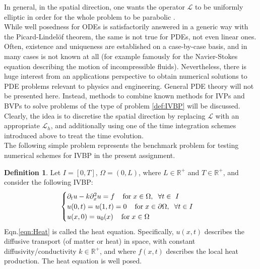 \documentclass[11pt]{article}
\theoremstyle{theorem}
\theoremstyle{definition}
\newtheorem{definition}{Definition}
\begin{document}
In general, in the spatial direction, one wants the operator $\mathcal{L}$ to be uniformly elliptic in order for the whole problem to be parabolic .\\

While well posedness for ODEs is satisfactorily answered in a generic way with the Picard-Lindelöf theorem, the same is not true for PDEs, not even linear ones. Often,
existence and uniqueness are established on a case-by-case basis, and in many cases is not known at all (for example famously for the Navier-Stokes equation describing the motion of incompressible fluids). Nevertheless, there is huge interest from an applications perspective to obtain numerical solutions to PDE problems relevant to physics and
engineering. General PDE theory will not be presented here. Instead, methods to combine known methods for IVPs and BVPs to solve problems of the type of problem \ref{def:IVBP} will be discussed. Clearly, the idea is to discretise the spatial direction by replacing $\mathcal{L}$ with an appropriate $\mathcal{L}_h$, and additionally using one of the time integration schemes introduced above to treat the time evolution.\\

The following simple problem represents the benchmark problem for testing numerical schemes for IVBP in the present assignment.\\

\begin{definition}
	\label{def:Heat}
	Let $I=[0,T]$, $\Omega=(0,L)$, where $L\in\mathbb{R}^+$ and $T\in\mathbb{R}^+$, and consider the following IVBP:
	\begin{align}
	\label{eqn:Heat}
	\begin{cases}
	\partial_t u - k\partial^2_x u = f\hspace{4mm}\text{for}\hspace{1mm}x\in\Omega,\hspace{2mm}\forall t\in\ I\\
	u(0, t)=u(1, t)=0\hspace{4mm}\text{for}\hspace{1mm}x\in\partial\Omega,\hspace{2mm}\forall t\in I\\
	u(x,0)=u_0(x)\hspace{4mm}\text{for}\hspace{1mm}x\in\Omega
	\end{cases}
	\end{align} 
	Eqn.\eqref{eqn:Heat} is called the heat equation. Specifically, $u(x,t)$ 	describes the diffusive transport (of matter or heat) in space, with constant diffusivity/conductivity $k\in\mathbb{R}^+$, and where $f(x,t)$ describes
	the local heat production. The heat equation is well posed.\\
\end{definition}
\end{document}
